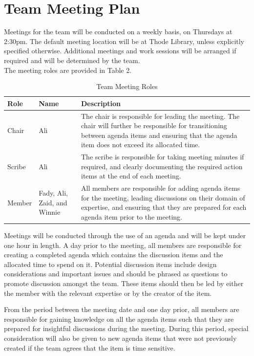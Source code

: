 \documentclass{article}
\begin{document}
\section{Team Meeting Plan}

Meetings for the team will be conducted on a weekly basis, on Thursdays at 2:30pm. The default meeting location will be at Thode Library, unless explicitly specified otherwise. Additional meetings and work sessions will be arranged if required and will be determined by the team. 
\\
The meeting roles are provided in Table 2.
\begin{table}[!h]
\begin{center}
\caption {Team Meeting Roles} \label{tab:title}
\begin{tabular}{ | m{2cm} | m{2cm} | m{8cm} | }
\hline
 Role & Name & Description \\ 
 \hline
 Chair & Ali & The chair is responsible for leading the meeting. The chair will further be responsible for transitioning between agenda items and ensuring that the agenda item does not exceed its allocated time.   \\  
 \hline
 Scribe & Ali & The scribe is responsible for taking meeting minutes if required, and clearly documenting the required action items at the end of each meeting. \\
 \hline
 Member & Fady, Ali, Zaid, and Winnie & All members are responsible for adding agenda items for the meeting, leading discussions on their domain of expertise, and ensuring that they are prepared for each agenda item prior to the meeting. \\
 \hline
\end{tabular}
\end{center}
\end{table}

Meetings will be conducted through the use of an agenda and will be kept under one hour in length. A day prior to the meeting, all members are responsible for creating a completed agenda which contains the discussion items and the allocated time to spend on it. Potential discussion items include design considerations and important issues and should be phrased as questions to promote discussion amongst the team. These items should then be led by either the member with the relevant expertise or by the creator of the item.  

From the period between the meeting date and one day prior, all members are responsible for gaining knowledge on all the agenda items such that they are prepared for insightful discussions during the meeting. During this period, special consideration will also be given to new agenda items that were not previously created if the team agrees that the item is time sensitive. 
\end{document}
